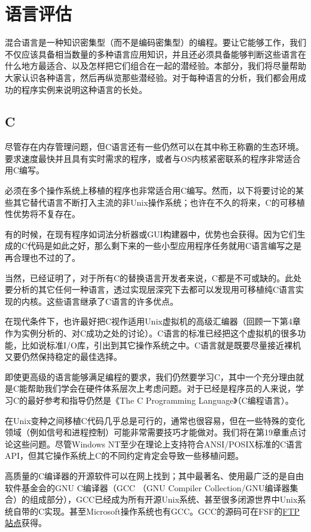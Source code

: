 \documentclass[12pt,oneside]{book}
\begin{document}
\section{语言评估}
混合语言是一种知识密集型（而不是编码密集型）的编程。要让它能够工作，我们不仅应该具备相当数量的多种语言应用知识，并且还必须具备能够判断这些语言在什么地方最适合、以及怎样把它们组合在一起的潜经验。本部分，我们将尽量帮助大家认识各种语言，然后再纵览那些潜经验。对于每种语言的分析，我们都会用成功的程序实例来说明这种语言的长处。

\subsection{C}
尽管存在内存管理问题，但C语言还有一些仍然可以在其中称王称霸的生态环境。要求速度最快并且具有实时需求的程序，或者与OS内核紧密联系的程序非常适合用C编写。

必须在多个操作系统上移植的程序也非常适合用C编写。然而，以下将要讨论的某些其它替代语言不断打入主流的非Unix操作系统；也许在不久的将来，C的可移植性优势将不复存在。

有的时候，在现有程序如词法分析器或GUI构建器中，优势也会获得。因为它们生成的C代码是如此之好，那么剩下来的一些小型应用程序任务就用C语言编写之是再合理也不过的了。

当然，已经证明了，对于所有C的替换语言开发者来说，C都是不可或缺的。此处要分析的其它任何一种语言，透过实现层深究下去都可以发现用可移植纯C语言实现的内核。这些语言继承了C语言的许多优点。

在现代条件下，也许最好把C视作适用Unix虚拟机的高级汇编器（回顾一下第4章作为实例分析的、对C成功之处的讨论）。C语言的标准已经把这个虚拟机的很多功能，比如说标准I/O库，引出到其它操作系统之中。C语言就是既要尽量接近裸机又要仍然保持稳定的最佳选择。

即使更高级的语言能够满足编程的要求，我们仍然要学习C，其中一个充分理由就是C能帮助我们学会在硬件体系层次上考虑问题。对于已经是程序员的人来说，学习C的最好参考和指导仍然是《The C Programming Language》（C编程语言）\cite{Kernighan-Ritchie}。

在Unix变种之间移植C代码几乎总是可行的，通常也很容易，但在一些特殊的变化领域（例如信号和进程控制）可能非常需要技巧才能做对。我们将在第19章重点讨论这些问题。尽管Windows NT至少在理论上支持符合ANSI/POSIX标准的C语言API，但其它操作系统上C的不同约定肯定会导致一些移植问题。

高质量的C编译器的开源软件可以在网上找到；其中最著名、使用最广泛的是自由软件基金会的GNU C编译器（GCC （GNU Compiler Collection/GNU编译器集合）的组成部分），GCC已经成为所有开源Unix系统、甚至很多闭源世界中Unix系统自带的C实现。甚至Microsoft操作系统也有GCC。GCC的源码可在FSF的\href{Kernighan-Ritchie}{FTP站点}获得。
\end{document}

